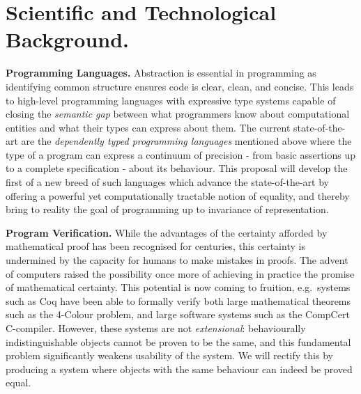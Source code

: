 \documentclass[a4paper,11pt]{article}
\newcommand{\eg}{{e.g.}\ }
\begin{document}

\vspace*{-0.1in} 
\section{Scientific and Technological Background.}
\vspace*{-0.1in} 

{\bf Programming Languages.} Abstraction is essential in programming
as identifying common structure ensures code is clear,
clean, and concise. This leads to high-level
programming languages with expressive type systems capable of closing
the {\em semantic gap} between what programmers know about
computational entities and what their types can express about them.
The current state-of-the-art are the {\em dependently typed
  programming languages} mentioned above where
the type of a program can express a
continuum of precision - from basic assertions up to a complete
specification - about its behaviour. This proposal will
develop the first of a new breed of 
such languages which advance the state-of-the-art by offering a
powerful yet computationally tractable notion of equality, and thereby bring to
reality the goal of programming up to invariance of representation.


{\bf Program Verification.} While the advantages of the certainty
afforded by mathematical proof has been recognised for centuries, this
certainty is undermined by the capacity for humans to make mistakes in
proofs. The advent of computers raised the possibility once more of
achieving in practice the promise of mathematical certainty. This
potential is now coming to fruition, \eg systems such as Coq have been
able to formally verify both large mathematical theorems such as the
4-Colour problem, and large software systems such as the CompCert
C-compiler. However, these systems are not {\em extensional}:
behaviourally indistinguishable objects cannot be proven to be the
same, and this fundamental problem significantly weakens usability of the
system. We will rectify this by producing a system where
objects with the same behaviour can indeed be proved equal.
\end{document}
